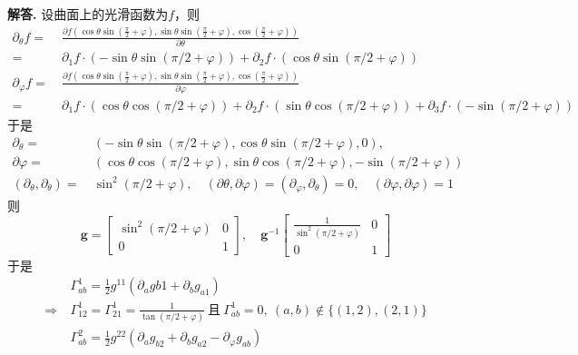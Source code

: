 \documentclass[12pt, a4paper, oneside]{ctexart}
\newenvironment{solution}[1][]{\par\noindent\textbf{#1解答. }}{\smallskip\par}  %
\def\bd{\boldsymbol}        %
\begin{document}
\begin{solution}
    设曲面上的光滑函数为$f$，则
    \begin{align*}
        \partial_\theta f =&\ \frac{\partial f(\cos\theta\sin(\frac{\pi}{2}+\varphi),\sin\theta\sin(\frac{\pi}{2}+\varphi),\cos(\frac{\pi}{2}+\varphi))}{\partial \theta}\\
        =&\ \partial_1f\cdot(-\sin\theta\sin(\pi/2+\varphi))+\partial_2 f\cdot(\cos\theta\sin(\pi/2+\varphi))\\
        \partial_\varphi f =&\ \frac{\partial f(\cos\theta\sin(\frac{\pi}{2}+\varphi),\sin\theta\sin(\frac{\pi}{2}+\varphi),\cos(\frac{\pi}{2}+\varphi))}{\partial \varphi}\\
        =&\ \partial_1f\cdot(\cos\theta\cos(\pi/2+\varphi))+\partial_2f\cdot(\sin\theta\cos(\pi/2+\varphi))+\partial_3f\cdot(-\sin(\pi/2+\varphi))
    \end{align*}
    于是
    \begin{align*}
        \partial_\theta =&\ (-\sin\theta\sin(\pi/2+\varphi),\cos\theta\sin(\pi/2+\varphi),0),\\
        \partial\varphi=&\ (\cos\theta\cos(\pi/2+\varphi),\sin\theta\cos(\pi/2+\varphi),-\sin(\pi/2+\varphi))\\
        (\partial_\theta,\partial_\theta) =&\ \sin^2(\pi/2+\varphi),\quad(\partial\theta,\partial\varphi) = (\partial_\varphi,\partial_\theta) = 0,\quad (\partial\varphi,\partial\varphi) = 1
    \end{align*}
    则
    \begin{equation*}
        \bd{g} = \begin{bmatrix}
            \sin^2(\pi/2+\varphi)&0\\
            0&1
        \end{bmatrix},\quad\bd{g}^{-1}\begin{bmatrix}
            \frac{1}{\sin^2(\pi/2+\varphi)}&0\\
            0&1
        \end{bmatrix}
    \end{equation*}
    于是
    \begin{align*}
        &\ \Gamma_{ab}^1 = \frac{1}{2}g^{11}(\partial_a g{b1} + \partial_b g_{a1})\\
        \Rightarrow&\ \Gamma_{12}^1 = \Gamma_{21}^1 = \frac{1}{\tan(\pi/2+\varphi)}\ \text{且}\  \Gamma_{ab}^1 = 0,\ (a,b)\notin\{(1,2),(2,1)\}\\
        &\ \Gamma_{ab}^2 = \frac{1}{2}g^{22}(\partial_a g_{b2}+\partial_bg_{a2}-\partial_{\varphi}g_{ab})\\

\end{align*}
\end{solution}
\end{document}
